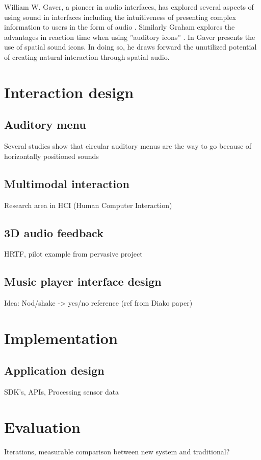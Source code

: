 \documentclass{article}
\begin{document}
William W. Gaver, a pioneer in audio interfaces, has explored several aspects of using sound in interfaces including the intuitiveness of presenting complex information to users in the form of audio \cite{gaver_sonicfinder:_1989}. Similarly Graham explores the advantages in reaction time when using ”auditory icons” \cite{graham_use_1999}. In \cite{gaver_auditory_1986} Gaver presents the use of spatial sound icons. In doing so, he draws forward the unutilized potential of creating natural interaction through spatial audio.


\section{Interaction design}

\subsection{Auditory menu}
Several studies show that circular auditory menus are the way to go because of horizontally positioned sounds 

\subsection{Multimodal interaction}
Research area in HCI (Human Computer Interaction)

\subsection{3D audio feedback}
HRTF, pilot example from pervasive project

\subsection{Music player interface design}
Idea: Nod/shake -> yes/no reference (ref from Diako paper)


\section{Implementation}

\subsection{Application design}
SDK's, APIs, Processing sensor data


\section{Evaluation}
Iterations, measurable comparison between new system and traditional?
\end{document}
